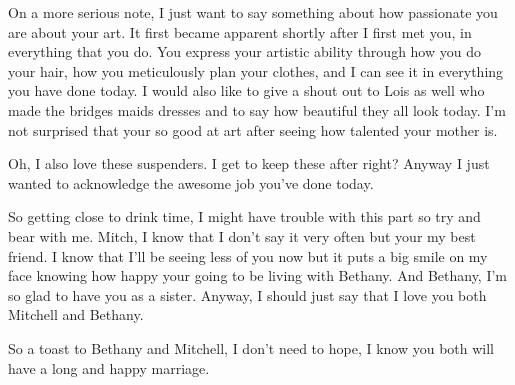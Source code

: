 On a more serious note, I just want to say something about how passionate you are about your art. It first became apparent shortly after I first met you, in everything that you do. You express your artistic ability through how you do your hair, how you meticulously plan your clothes, and I can see it in everything you have done today. I would also like to give a shout out to Lois as well who made the bridges maids dresses and to say how beautiful they all look today. I'm not surprised that your so good at art after seeing how talented your mother is. 

Oh, I also love these suspenders. I get to keep these after right? Anyway I just wanted to acknowledge the awesome job you've done today.

So getting close to drink time, I might have trouble with this part so try and bear with me. Mitch, I know that I don't say it very often but your my best friend. I know that I'll be seeing less of you now but it puts a big smile on my face knowing how happy your going to be living with Bethany. And Bethany, I'm so glad to have you as a sister. Anyway, I should just say that I love you both Mitchell and Bethany.

So a toast to Bethany and Mitchell, I don't need to hope, I know you both will have a long and happy marriage.
